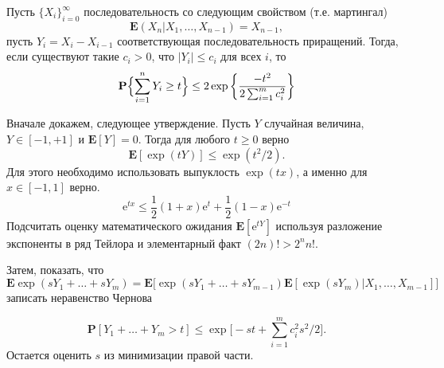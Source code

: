 \begin{problem}
Пусть $\{X_i\}_{i=0}^{\infty}$ последовательность со следующим свойством (т.е. мартингал)
\begin{equation*}
\mathbf{E}(X_n|X_1,\dots,X_{n-1}) =X_{n-1},
\end{equation*}
 пусть $Y_i = X_i-X_{i-1}$ соответствующая последовательность приращений. Тогда, если существуют такие $c_i>0$, что $|Y_i|\leq c_i$ для всех $i$, то
\begin{equation*}
\mathbf{P}\Bigl\{\sum_{i=1}^{n}Y_i \geq t\Bigr\}\leq 2\exp\bigg\{\frac{-t^2}{2\sum_{i=1}^{m}c^2_i}\biggl\}
\end{equation*}
\end{problem}
\begin{remark}


Вначале докажем, следующее утверждение.
 Пусть $Y$ случайная величина,  $Y\in [-1,+1]$ и $\mathbf{E}[Y]=0$. Тогда для любого $t\geq 0$ верно 
\begin{equation*}
\mathbf{E}[\exp(tY)]\leq \exp(t^2/2).
\end{equation*}
Для этого необходимо использовать выпуклость $\exp(tx)$, а именно для $x\in[-1,1]$ верно.
\begin{equation*}
\text{e}^{tx}\leq \frac{1}{2}(1+x)\text{e}^{t} +\frac{1}{2}(1-x)\text{e}^{-t}
\end{equation*}
Подсчитать оценку математического ожидания $\mathbf{E}[\text{e}^{tY}]$ используя разложение экспоненты в ряд Тейлора и элементарный факт $(2n)!>2^nn!$.  


Затем, показать, что 
\begin{equation*}
\mathbf{E}\exp(sY_1+\dots+ sY_m) = \mathbf{E}\big[\exp(sY_1+\dots+sY_{m-1})\mathbf{E}[\exp(sY_m)|X_{1},\dots,X_{m-1}]\bigl] 
\end{equation*}
записать неравенство Чернова

\begin{equation*}
\mathbf{P}[Y_1+\dots+Y_m>t]\leq \exp\big[-st+\sum_{i=1}^mc^2_i s^2/2\bigr].
\end{equation*}
Остается оценить $s$ из минимизации правой части.

\end{remark}

